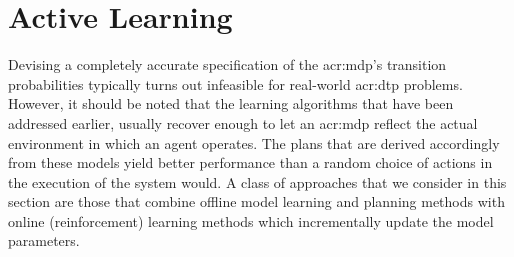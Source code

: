 
%
%


%
%

%
%

\section{Active Learning}
\label{sec:active-learning}

Devising a completely accurate specification of the \acrshort{acr:mdp}'s transition probabilities typically turns out infeasible for real-world \acrshort{acr:dtp} problems.
However, it should be noted that the learning algorithms that have been addressed earlier, usually recover enough to let an \acrshort{acr:mdp} reflect the actual environment in which an agent operates.
The plans that are derived accordingly from these models yield better performance than a random choice of actions in the execution of the system would.
A class of approaches that we consider in this section are those that combine offline model learning and planning methods with online (reinforcement) learning methods which incrementally update the model parameters.


